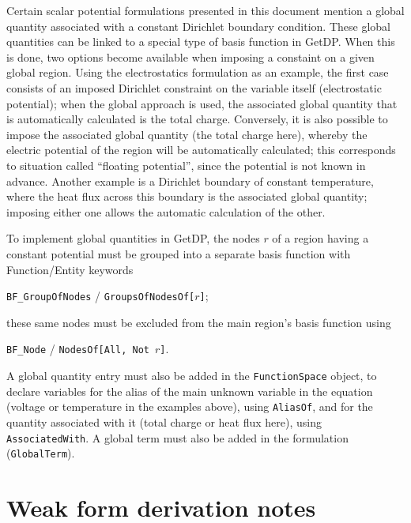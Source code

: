 \documentclass[letterpaper]{article}
\newcommand{\keyw}[1]{\texttt{\small #1}}
\begin{document}
Certain scalar potential formulations presented in this document mention a global quantity associated with a constant Dirichlet boundary condition. These global quantities can be linked to a special type of basis function in GetDP. When this is done, two options become available when imposing a constaint on a given global region. Using the electrostatics formulation as an example, the first case consists of an imposed Dirichlet constraint on the variable itself (electrostatic potential); when the global approach is used, the associated global quantity that is automatically calculated is the total charge. Conversely, it is also possible to impose the associated global quantity (the total charge here), whereby the electric potential of the region will be automatically calculated; this corresponds to situation called ``floating potential'', since the potential is not known in advance. Another example is a Dirichlet boundary of constant temperature, where the heat flux across this boundary is the associated global quantity; imposing either one allows the automatic calculation of the other.

To implement global quantities in GetDP, the nodes $r$ of a region having a constant potential must be grouped into a separate basis function with Function/Entity keywords
\begin{center}
\keyw{BF\_GroupOfNodes} / \keyw{GroupsOfNodesOf[}$r$\keyw{]};
\end{center}
these same nodes must be excluded from the main region's basis function using 
\begin{center}
\keyw{BF\_Node} / \keyw{NodesOf[All, Not}~$r$\keyw{]}.
\end{center}

A global quantity entry must also be added in the \keyw{FunctionSpace} object, to declare variables for the alias of the main unknown variable in the equation (voltage or temperature in the examples above), using \keyw{AliasOf}, and for the quantity associated with it (total charge or heat flux here), using \keyw{AssociatedWith}. A global term must also be added in the formulation (\keyw{GlobalTerm}). 





\clearpage
\section{Weak form derivation notes}
\label{sec_weak}
\end{document}
